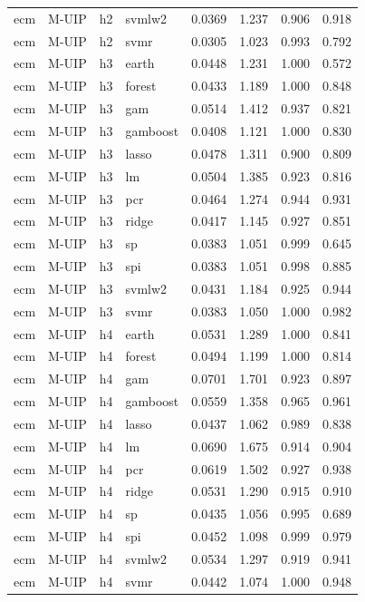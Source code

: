 \begin{ThreePartTable}
\begin{longtable}[t]{llclcccc}
ecm & M-UIP & h2 & svmlw2 & 0.0369 & 1.237 & 0.906 & 0.918\\
ecm & M-UIP & h2 & svmr & 0.0305 & 1.023 & 0.993 & 0.792\\
\addlinespace
ecm & M-UIP & h3 & earth & 0.0448 & 1.231 & 1.000 & 0.572\\
ecm & M-UIP & h3 & forest & 0.0433 & 1.189 & 1.000 & 0.848\\
ecm & M-UIP & h3 & gam & 0.0514 & 1.412 & 0.937 & 0.821\\
ecm & M-UIP & h3 & gamboost & 0.0408 & 1.121 & 1.000 & 0.830\\
ecm & M-UIP & h3 & lasso & 0.0478 & 1.311 & 0.900 & 0.809\\
ecm & M-UIP & h3 & lm & 0.0504 & 1.385 & 0.923 & 0.816\\
ecm & M-UIP & h3 & pcr & 0.0464 & 1.274 & 0.944 & 0.931\\
ecm & M-UIP & h3 & ridge & 0.0417 & 1.145 & 0.927 & 0.851\\
ecm & M-UIP & h3 & sp & 0.0383 & 1.051 & 0.999 & 0.645\\
ecm & M-UIP & h3 & spi & 0.0383 & 1.051 & 0.998 & 0.885\\
ecm & M-UIP & h3 & svmlw2 & 0.0431 & 1.184 & 0.925 & 0.944\\
ecm & M-UIP & h3 & svmr & 0.0383 & 1.050 & 1.000 & 0.982\\
\addlinespace
ecm & M-UIP & h4 & earth & 0.0531 & 1.289 & 1.000 & 0.841\\
ecm & M-UIP & h4 & forest & 0.0494 & 1.199 & 1.000 & 0.814\\
ecm & M-UIP & h4 & gam & 0.0701 & 1.701 & 0.923 & 0.897\\
ecm & M-UIP & h4 & gamboost & 0.0559 & 1.358 & 0.965 & 0.961\\
ecm & M-UIP & h4 & lasso & 0.0437 & 1.062 & 0.989 & 0.838\\
ecm & M-UIP & h4 & lm & 0.0690 & 1.675 & 0.914 & 0.904\\
ecm & M-UIP & h4 & pcr & 0.0619 & 1.502 & 0.927 & 0.938\\
ecm & M-UIP & h4 & ridge & 0.0531 & 1.290 & 0.915 & 0.910\\
ecm & M-UIP & h4 & sp & 0.0435 & 1.056 & 0.995 & 0.689\\
ecm & M-UIP & h4 & spi & 0.0452 & 1.098 & 0.999 & 0.979\\
ecm & M-UIP & h4 & svmlw2 & 0.0534 & 1.297 & 0.919 & 0.941\\
ecm & M-UIP & h4 & svmr & 0.0442 & 1.074 & 1.000 & 0.948\\

\end{longtable}
\end{ThreePartTable}
